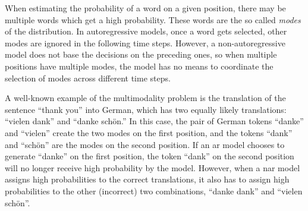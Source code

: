 When estimating the probability of a word on a given position, there may be
multiple words which get a high probability. These words are the so called
\emph{modes} of the distribution. In autoregressive models, once a word gets
selected, other modes are ignored in the following time steps. However, a
non-autoregressive model does not base the decisions on the preceding ones, so
when multiple positions have multiple modes, the model has no means to
coordinate the selection of modes across different time steps.




A well-known example of the multimodality problem is the translation of the
sentence ``thank you'' into German, which has two equally likely translations:
``vielen dank'' and ``danke schön.'' In this case, the pair of German tokens
``danke'' and ``vielen'' create the two modes on the first position, and the
tokens ``dank'' and ``schön'' are the modes on the second position. If an
\acl{ar} model chooses to generate ``danke'' on the first position, the token
``dank'' on the second position will no longer receive high probability by the
model. However, when a \acl{nar} model assigns high probabilities to the
correct translations, it also has to assign high probabilities to the other
(incorrect) two combinations, ``danke dank'' and ``vielen schön''. 

